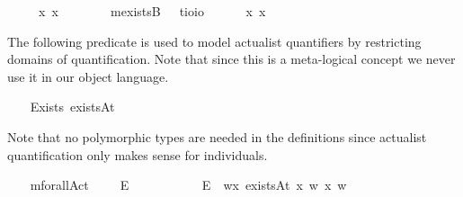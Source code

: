 \begin{isabellebody}
\isanewline
\ \ \ \ \ {\isachardoublequoteopen}\isactrlbold {\isasymforall}x{\isachardot}\ {\isasymphi}{\isacharparenleft}x{\isacharparenright}\ {\isasymequiv}\ \isactrlbold {\isasymforall}{\isasymphi}{\isachardoublequoteclose}\ \ \isanewline
\ \ \isamarkupfalse%
\ mexistsB\ \ {\isacharcolon}{\isacharcolon}\ {\isachardoublequoteopen}{\isacharparenleft}{\isacharprime}t{\isasymRightarrow}io{\isacharparenright}{\isasymRightarrow}io{\isachardoublequoteclose}\ {\isacharparenleft}\isanewline
\ \ \ \ \ {\isachardoublequoteopen}\isactrlbold {\isasymexists}x{\isachardot}\ {\isasymphi}{\isacharparenleft}x{\isacharparenright}\ {\isasymequiv}\ \isactrlbold {\isasymexists}{\isasymphi}{\isachardoublequoteclose}%
\isamarkuptrue%
%
\begin{isamarkuptext}%
The following predicate is used to model actualist quantifiers by restricting domains of quantification.
Note that since this is a meta-logical concept we never use it in our object language.%
\end{isamarkuptext}\isamarkuptrue%
\ \ \isamarkupfalse%
\ Exists{\isacharcolon}{\isacharcolon}{\isachardoublequoteopen}{\isasymup}{\isasymlangle}{\isasymzero}{\isasymrangle}{\isachardoublequoteclose}\ {\isacharparenleft}{\isachardoublequoteopen}existsAt{\isachardoublequoteclose}{\isacharparenright}%
\begin{isamarkuptext}%
Note that no polymorphic types are needed in the definitions since actualist quantification only makes sense for individuals.%
\end{isamarkuptext}\isamarkuptrue%
\ \ \isamarkupfalse%
\ mforallAct\ \ \ {\isacharcolon}{\isacharcolon}\ {\isachardoublequoteopen}{\isasymup}{\isasymlangle}{\isasymup}{\isasymlangle}{\isasymzero}{\isasymrangle}{\isasymrangle}{\isachardoublequoteclose}\ {\isacharparenleft}{\isachardoublequoteopen}\isactrlbold {\isasymforall}\isactrlsup E{\isachardoublequoteclose}{\isacharparenright}\ \ \ \ \ \ \isanewline
\ \ \ \ \ {\isachardoublequoteopen}\isactrlbold {\isasymforall}\isactrlsup E{\isasymPhi}\ {\isasymequiv}\ {\isasymlambda}w{\isachardot}{\isasymforall}x{\isachardot}\ {\isacharparenleft}existsAt\ x\ w{\isacharparenright}{\isasymlongrightarrow}{\isacharparenleft}{\isasymPhi}\ x\ w{\isacharparenright}{\isachardoublequoteclose}\isanewline

\end{isabellebody}
